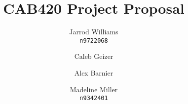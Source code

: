 \documentclass[]{report}   %
\begin{document}
\title{CAB420 Project Proposal}   %
\author{
	Jarrod Williams\\
	\texttt{n9722068}
	\and 
	Caleb Geizer\\
	\texttt{}
	\and
	Alex Barnier\\
	\texttt{}
	\and	
	Madeline Miller\\
	\texttt{n9342401}
}
\maketitle
\end{document}
